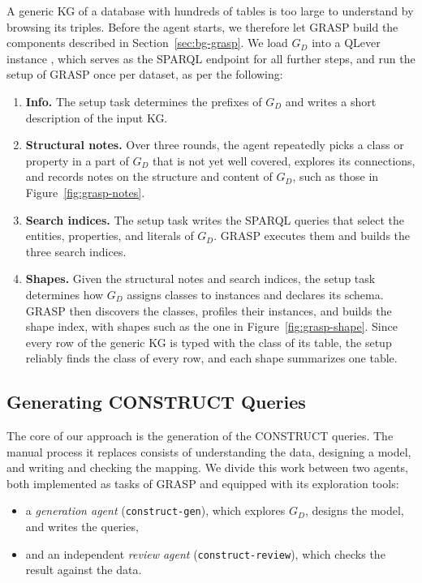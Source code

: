 A generic KG of a database with hundreds of tables is too large to understand by browsing its triples. Before the agent starts, we therefore let GRASP build the components described in Section~\ref{sec:bg-grasp}. We load \(G_D\) into a QLever instance \citep{bast2017qlever}, which serves as the SPARQL endpoint for all further steps, and run the setup of GRASP once per dataset, as per the following:
\begin{enumerate}[leftmargin=*, itemsep=2pt]
  \item \textbf{Info.} The setup task determines the prefixes of \(G_D\) and writes a short description of the input KG.
  \item \textbf{Structural notes.} Over three rounds, the agent repeatedly picks a class or property in a part of \(G_D\) that is not yet well covered, explores its connections, and records notes on the structure and content of \(G_D\), such as those in Figure~\ref{fig:grasp-notes}.
  \item \textbf{Search indices.} The setup task writes the SPARQL queries that select the entities, properties, and literals of \(G_D\). GRASP executes them and builds the three search indices.
  \item \textbf{Shapes.} Given the structural notes and search indices, the setup task determines how \(G_D\) assigns classes to instances and declares its schema. GRASP then discovers the classes, profiles their instances, and builds the shape index, with shapes such as the one in Figure~\ref{fig:grasp-shape}. Since every row of the generic KG is typed with the class of its table, the setup reliably finds the class of every row, and each shape summarizes one table. 
\end{enumerate}


\subsection{Generating CONSTRUCT Queries}\label{sec:approach-construct}

The core of our approach is the generation of the CONSTRUCT queries. The manual process it replaces consists of understanding the data, designing a model, and writing and checking the mapping. We divide this work between two agents, both implemented as tasks of GRASP and equipped with its exploration tools: 
\begin{itemize}[leftmargin=*, itemsep=2pt]
  \item a \emph{generation agent} (\texttt{construct-gen}), which explores \(G_D\), designs the model, and writes the queries, 
  \item and an independent \emph{review agent} (\texttt{construct-review}), which checks the result against the data.
\end{itemize}

